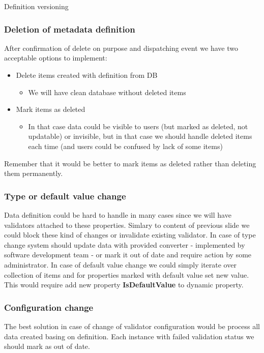 \documentclass{beamer}
\begin{document}
\begin{section}{Definition versioning}
\begin{frame}
\frametitle{Deletion of metadata definition}
After confirmation of delete on purpose and dispatching event we have two acceptable options to implement: 
\begin{itemize}
	\item Delete items created with definition from DB
		\begin{itemize}
			\item We will have clean database without deleted items
		\end{itemize}
	\item Mark items as deleted 
		\begin{itemize}
			\item In that case data could be visible to users (but marked as deleted, not updatable) or invisible, but in that case we should handle deleted items each time (and users could be confused by lack of some items)
		\end{itemize}
\end{itemize}
Remember that it would be better to mark items as deleted rather than deleting them permanently. 
\end{frame}

\begin{frame}
\frametitle{Type or default value change}
Data definition could be hard to handle in many cases since we will have validators attached to these properties. Simlary to content of previous slide we could block these kind of changes or invalidate existing validator.
\newline
In case of type change system should update data with provided converter - implemented by software development team - or mark it out of date and require action by some administrator. 
\newline
In case of default value change we could simply iterate over collection of items and for properties marked with default value set new value. This would require add new property \textbf{IsDefaultValue} to dynamic property. 

\end{frame}

\begin{frame}
\frametitle{Configuration change}
The best solution in case of change of validator configuration would be process all data created basing on definition. Each instance with failed validation status we should mark as out of date. 

\end{frame}


\end{section}
\end{document}
